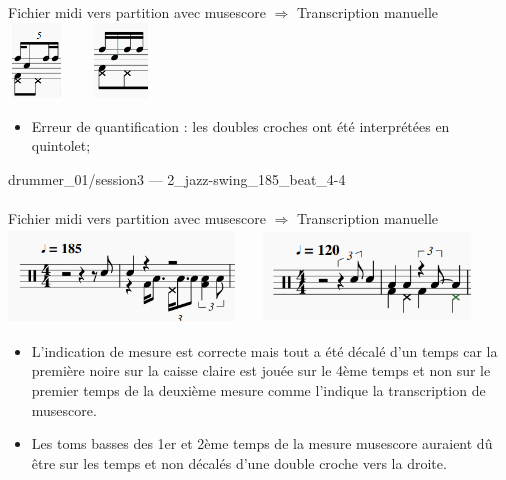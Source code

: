 Fichier midi vers partition avec musescore $\Rightarrow$ Transcription manuelle\\
\includegraphics[height=20mm, width=15mm]{z_images/transcriptions_manuelles/0_prise_en_main/0_tests_drummer_01__session3/musescore_1.png}\ \ \ \ 
\includegraphics[height=20mm, width=15mm]{z_images/transcriptions_manuelles/0_prise_en_main/0_tests_drummer_01__session3/manuel_1.png}\\
\begin{itemize}
	\item Erreur de quantification : les doubles croches ont été interprétées en quintolet;\\
\end{itemize}
drummer\_01/session3 — 2\_jazz-swing\_185\_beat\_4-4\\\\
Fichier midi vers partition avec musescore $\Rightarrow$ Transcription manuelle\\
\includegraphics[height=25mm, width=60mm]{z_images/transcriptions_manuelles/0_prise_en_main/0_tests_drummer_01__session3/musescore_2.png}\ \ \ \ 
\includegraphics[height=25mm, width=55mm]{z_images/transcriptions_manuelles/0_prise_en_main/0_tests_drummer_01__session3/manuel_2.png}
\begin{itemize}
	\item L’indication de mesure est correcte mais tout a été décalé d’un temps car la première noire sur la caisse claire est jouée sur le 4ème temps et non sur le premier temps de la deuxième mesure comme l’indique la transcription de musescore.
	\item Les toms basses des 1er et 2ème temps de la mesure musescore auraient dû être sur les temps et non décalés d’une double croche vers la droite.\\
\end{itemize}
